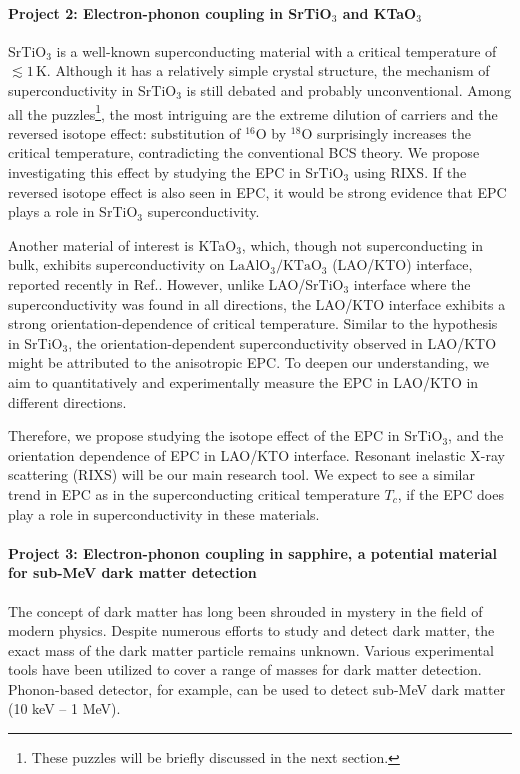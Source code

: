 \documentclass[11pt]{article}
\begin{document}
\paragraph{Project 2: Electron-phonon coupling in SrTiO$_{3}$ and KTaO$_{3}$} 
SrTiO$_{3}$ is a well-known superconducting material with a critical temperature of $\lesssim 1\, \mathrm{K}$\cite{schooley_superconductivity_1964,lin_fermi_2013}. 
Although it has a  relatively simple crystal structure, the mechanism of superconductivity in SrTiO$_{3}$ is still debated and probably unconventional. 
Among all the puzzles\footnote{These puzzles will be briefly discussed in the next section.}, the most intriguing are the extreme dilution of carriers and the reversed isotope effect: substitution of ${}^{16}\mathrm{O}$ by ${}^{18}\mathrm{O}$ surprisingly increases the critical temperature, contradicting the conventional BCS theory\cite{stucky_isotope_2016}. 
We propose investigating this effect by studying the EPC in SrTiO$_{3}$ using RIXS. If the reversed isotope effect is also seen in EPC, it would be strong evidence that EPC plays a role in SrTiO$_{3}$ superconductivity.

Another material of interest is KTaO$_{3}$, which, though not superconducting in bulk, exhibits superconductivity on $\mathrm{LaAlO_{3}/KTaO_{3}}$ (LAO/KTO) interface, reported recently in Ref.\cite{ren_two-dimensional_2022}. 
However, unlike LAO/SrTiO$_{3}$ interface where the superconductivity was found in all directions, the LAO/KTO interface exhibits a strong orientation-dependence of critical temperature\cite{ren_two-dimensional_2022,chen_two-dimensional_2021}. Similar to the hypothesis in SrTiO$_{3}$, the orientation-dependent superconductivity observed in LAO/KTO might be attributed to the anisotropic EPC. 
To deepen our understanding, we aim to quantitatively and experimentally measure the EPC in LAO/KTO in different directions. 

Therefore, we propose studying the isotope effect of the EPC in SrTiO$_{3}$, and the orientation dependence of EPC in LAO/KTO interface. 
Resonant inelastic X-ray scattering (RIXS) will be our main research tool. 
We expect to see a similar trend in EPC as in the superconducting critical temperature $T_{c}$, if the EPC does play a role in superconductivity in these materials.

\paragraph{Project 3: Electron-phonon coupling in sapphire, a potential material for sub-MeV dark matter detection}
The concept of dark matter has long been shrouded in mystery in the field of modern physics. 
Despite numerous efforts to study and detect dark matter\cite{bergstrom_non-baryonic_2000,vogel_dark_2014,essig_first_2012,davidson_updated_2000}, the exact mass of the dark matter particle remains unknown. 
Various experimental tools have been utilized to cover a range of masses for dark matter detection. 
Phonon-based detector, for example, can be used to detect sub-MeV dark matter (10 keV -- 1 MeV)\cite{griffin_directional_2018}.
  
\end{document}
